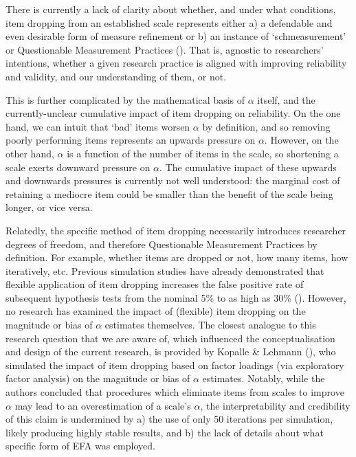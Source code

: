 \documentclass[
  nonatbib,
  authoryear,
  preprint]{elsarticle}
\begin{document}
There is currently a lack of clarity about whether, and under what
conditions, item dropping from an established scale represents either a)
a defendable and even desirable form of measure refinement or b) an
instance of `schmeasurement' or Questionable Measurement Practices
(). That is,
agnostic to researchers' intentions, whether a given research practice
is aligned with improving reliability and validity, and our
understanding of them, or not.

This is further complicated by the mathematical basis of \(\alpha\)
itself, and the currently-unclear cumulative impact of item dropping on
reliability. On the one hand, we can intuit that `bad' items worsen
\(\alpha\) by definition, and so removing poorly performing items
represents an upwards pressure on \(\alpha\). However, on the other
hand, \(\alpha\) is a function of the number of items in the scale, so
shortening a scale exerts downward pressure on \(\alpha\). The
cumulative impact of these upwards and downwards pressures is currently
not well understood: the marginal cost of retaining a mediocre item
could be smaller than the benefit of the scale being longer, or vice
versa.

Relatedly, the specific method of item dropping necessarily introduces
researcher degrees of freedom, and therefore Questionable Measurement
Practices by definition. For example, whether items are dropped or not,
how many items, how iteratively, etc. Previous simulation studies have
already demonstrated that flexible application of item dropping
increases the false positive rate of subsequent hypothesis tests from
the nominal 5\% to as high as 30\%
(). However,
no research has examined the impact of (flexible) item dropping on the
magnitude or bias of \(\alpha\) estimates themselves. The closest
analogue to this research question that we are aware of, which
influenced the conceptualisation and design of the current research, is
provided by Kopalle \& Lehmann
(), who simulated the impact of
item dropping based on factor loadings (via exploratory factor analysis)
on the magnitude or bias of \(\alpha\) estimates. Notably, while the
authors concluded that procedures which eliminate items from scales to
improve \(\alpha\) may lead to an overestimation of a scale's
\(\alpha\), the interpretability and credibility of this claim is
undermined by a) the use of only 50 iterations per simulation, likely
producing highly stable results, and b) the lack of details about what
specific form of EFA was employed.
\end{document}
